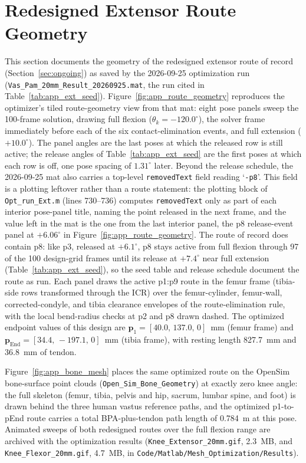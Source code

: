 \section{Redesigned Extensor Route Geometry}\label{app:route_geometry}

This section documents the geometry of the redesigned extensor route of record (Section~\ref{sec:ongoing}) as saved by the 2026-09-25 optimization run (\texttt{Vas\_Pam\_20mm\_Result\_20260925.mat}, the run cited in Table~\ref{tab:app_ext_seed}). Figure~\ref{fig:app_route_geometry} reproduces the optimizer's tiled route-geometry view from that mat: eight pose panels sweep the 100-frame solution, drawing full flexion ($\theta_{k}=-120.0^{\circ}$), the solver frame immediately before each of the six contact-elimination events, and full extension ($+10.0^{\circ}$). The panel angles are the last poses at which the released row is still active; the release angles of Table~\ref{tab:app_ext_seed} are the first poses at which each row is off, one pose spacing of $1.31^{\circ}$ later. Beyond the release schedule, the 2026-09-25 mat also carries a top-level \texttt{removedText} field reading `\texttt{-p8}'. This field is a plotting leftover rather than a route statement: the plotting block of \texttt{Opt\_run\_Ext.m} (lines 730--736) computes \texttt{removedText} only as part of each interior pose-panel title, naming the point released in the next frame, and the value left in the mat is the one from the last interior panel, the p8 release-event panel at $+6.06^{\circ}$ in Figure~\ref{fig:app_route_geometry}. The route of record does contain p8: like p3, released at $+6.1^{\circ}$, p8 stays active from full flexion through 97 of the 100 design-grid frames until its release at $+7.4^{\circ}$ near full extension (Table~\ref{tab:app_ext_seed}), so the seed table and release schedule document the route as run. Each panel draws the active p1:p9 route in the femur frame (tibia-side rows transformed through the ICR) over the femur-cylinder, femur-wall, corrected-condyle, and tibia clearance envelopes of the route-elimination rule, with the local bend-radius checks at p2 and p8 drawn dashed. The optimized endpoint values of this design are $\mathbf{p}_{1} = [40.0,\,137.0,\,0]$~mm (femur frame) and $\mathbf{p}_{\text{End}} = [34.4,\,-197.1,\,0]$~mm (tibia frame), with resting length \qty{827.7}{\mm} and \qty{36.8}{\mm} of tendon.

Figure~\ref{fig:app_bone_mesh} places the same optimized route on the OpenSim bone-surface point clouds (\texttt{Open\_Sim\_Bone\_Geometry}) at exactly zero knee angle: the full skeleton (femur, tibia, pelvis and hip, sacrum, lumbar spine, and foot) is drawn behind the three human vastus reference paths, and the optimized p1-to-pEnd route carries a total BPA-plus-tendon path length of \qty{0.784}{\m} at this pose. Animated sweeps of both redesigned routes over the full flexion range are archived with the optimization results (\texttt{Knee\_Extensor\_20mm.gif}, 2.3~MB, and \texttt{Knee\_Flexor\_20mm.gif}, 4.7~MB, in \texttt{Code/Matlab/Mesh\_Optimization/Results}).

